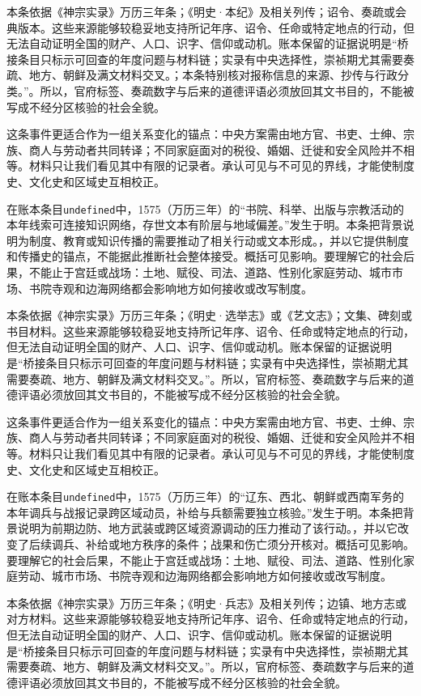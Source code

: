 本条依据《神宗实录》万历三年条；《明史·本纪》及相关列传；诏令、奏疏或会典版本。这些来源能够较稳妥地支持所记年序、诏令、任命或特定地点的行动，但无法自动证明全国的财产、人口、识字、信仰或动机。账本保留的证据说明是“桥接条目只标示可回查的年度问题与材料链；实录有中央选择性，崇祯期尤其需要奏疏、地方、朝鲜及满文材料交叉。；本条特别核对报称信息的来源、抄传与行政分类。”。所以，官府标签、奏疏数字与后来的道德评语必须放回其文书目的，不能被写成不经分区核验的社会全貌。

这条事件更适合作为一组关系变化的锚点：中央方案需由地方官、书吏、士绅、宗族、商人与劳动者共同转译；不同家庭面对的税役、婚姻、迁徙和安全风险并不相等。材料只让我们看见其中有限的记录者。承认可见与不可见的界线，才能使制度史、文化史和区域史互相校正。

在账本条目\texttt{undefined}中，1575（万历三年）的“书院、科举、出版与宗教活动的本年线索可连接知识网络，存世文本有阶层与地域偏差。”发生于明。本条把背景说明为制度、教育或知识传播的需要推动了相关行动或文本形成。，并以它提供制度和传播史的锚点，不能据此推断社会整体接受。概括可见影响。要理解它的社会后果，不能止于宫廷或战场：土地、赋役、司法、道路、性别化家庭劳动、城市市场、书院寺观和边海网络都会影响地方如何接收或改写制度。

本条依据《神宗实录》万历三年条；《明史·选举志》或《艺文志》；文集、碑刻或书目材料。这些来源能够较稳妥地支持所记年序、诏令、任命或特定地点的行动，但无法自动证明全国的财产、人口、识字、信仰或动机。账本保留的证据说明是“桥接条目只标示可回查的年度问题与材料链；实录有中央选择性，崇祯期尤其需要奏疏、地方、朝鲜及满文材料交叉。”。所以，官府标签、奏疏数字与后来的道德评语必须放回其文书目的，不能被写成不经分区核验的社会全貌。

这条事件更适合作为一组关系变化的锚点：中央方案需由地方官、书吏、士绅、宗族、商人与劳动者共同转译；不同家庭面对的税役、婚姻、迁徙和安全风险并不相等。材料只让我们看见其中有限的记录者。承认可见与不可见的界线，才能使制度史、文化史和区域史互相校正。

在账本条目\texttt{undefined}中，1575（万历三年）的“辽东、西北、朝鲜或西南军务的本年调兵与战报记录跨区域动员，补给与兵额需要独立核验。”发生于明。本条把背景说明为前期边防、地方武装或跨区域资源调动的压力推动了该行动。，并以它改变了后续调兵、补给或地方秩序的条件；战果和伤亡须分开核对。概括可见影响。要理解它的社会后果，不能止于宫廷或战场：土地、赋役、司法、道路、性别化家庭劳动、城市市场、书院寺观和边海网络都会影响地方如何接收或改写制度。

本条依据《神宗实录》万历三年条；《明史·兵志》及相关列传；边镇、地方志或对方材料。这些来源能够较稳妥地支持所记年序、诏令、任命或特定地点的行动，但无法自动证明全国的财产、人口、识字、信仰或动机。账本保留的证据说明是“桥接条目只标示可回查的年度问题与材料链；实录有中央选择性，崇祯期尤其需要奏疏、地方、朝鲜及满文材料交叉。”。所以，官府标签、奏疏数字与后来的道德评语必须放回其文书目的，不能被写成不经分区核验的社会全貌。

